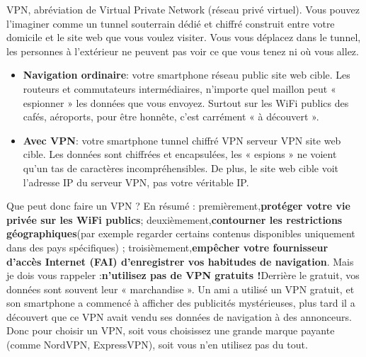 


VPN, abréviation de Virtual Private Network (réseau privé virtuel). Vous pouvez l'imaginer comme un tunnel souterrain dédié et chiffré construit entre votre domicile et le site web que vous voulez visiter. Vous vous déplacez dans le tunnel, les personnes à l'extérieur ne peuvent pas voir ce que vous tenez ni où vous allez.

\begin{itemize}
  \item \textbf{Navigation ordinaire}: votre smartphone réseau public site web cible. Les routeurs et commutateurs intermédiaires, n'importe quel maillon peut « espionner » les données que vous envoyez. Surtout sur les WiFi publics des cafés, aéroports, pour être honnête, c'est carrément « à découvert ».
  \item \textbf{Avec VPN}: votre smartphone tunnel chiffré VPN serveur VPN site web cible. Les données sont chiffrées et encapsulées, les « espions » ne voient qu'un tas de caractères incompréhensibles. De plus, le site web cible voit l'adresse IP du serveur VPN, pas votre véritable IP.
\end{itemize}

Que peut donc faire un VPN ? En résumé : premièrement,\textbf{protéger votre vie privée sur les WiFi publics}; deuxièmement,\textbf{contourner les restrictions géographiques}(par exemple regarder certains contenus disponibles uniquement dans des pays spécifiques) ; troisièmement,\textbf{empêcher votre fournisseur d'accès Internet (FAI) d'enregistrer vos habitudes de navigation}. Mais je dois vous rappeler :\textbf{n'utilisez pas de VPN gratuits !}Derrière le gratuit, vos données sont souvent leur « marchandise ». Un ami a utilisé un VPN gratuit, et son smartphone a commencé à afficher des publicités mystérieuses, plus tard il a découvert que ce VPN avait vendu ses données de navigation à des annonceurs. Donc pour choisir un VPN, soit vous choisissez une grande marque payante (comme NordVPN, ExpressVPN), soit vous n'en utilisez pas du tout.

